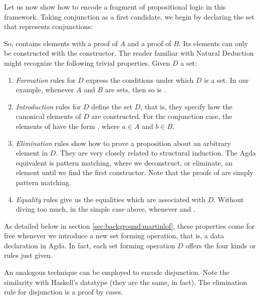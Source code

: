 Let us now show how to encode a fragment of propositional logic in this framework. Taking conjunction as a first candidate, we begin by declaring the set that represents conjunctions:


So,  contains elements with a proof of $A$ and a proof of $B$. Its elements
can only be constructed with the \IC{<\_,\_>} constructor. The reader familiar with Natural Deduction
might recognize the following trivial properties. Given $D$ a set:

\begin{enumerate} %
  \item \emph{Formation} rules for $D$ express the conditions under which $D$ is a set.
        In our example, whenever $A$ and $B$ are sets, then so is .
  \item \emph{Introduction} rules for $D$ define the set $D$, that is, they specify how the
        canonical elements of $D$ are constructed. For the conjunction case, 
        the elements of  have the form , where $a \in A$
        and $b \in B$. 
  \item \emph{Elimination} rules show how to prove a proposition about an arbitrary element in $D$.
        They are very closely related to structural induction. The Agda equivalent is pattern matching,
        where we deconstruct, or eliminate, an element until we find the first constructor. Note that
        the proofs of  are simply pattern matching.
  \item \emph{Equality} rules give us the equalities which are associated with $D$. Without diving
        too much, in the simple case above,  whenever 
        and .
\end{enumerate}

As detailed below in section \ref{sec:background:martinlof}, these properties come for free whenever we introduce 
a new set forming operation, that is, a data declaration in Agda. In fact, each set forming operation $D$ offers the four kinds or rules just given.

An analogous technique can be employed to encode disjunction. Note the similarity with
Haskell's  datatype (they are the same, in fact). The elimination rule for disjunction is a proof by cases. 


